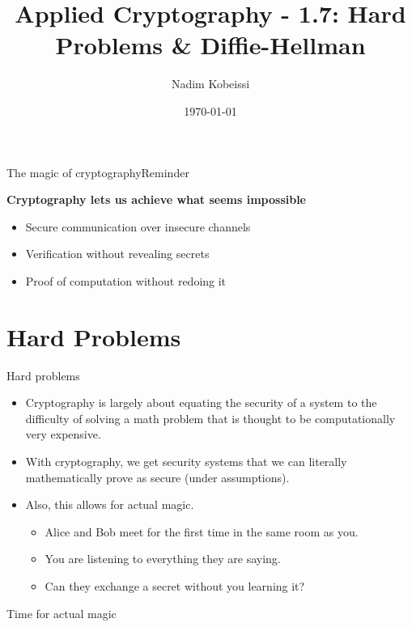 \ifdefined\PRESENTATION\else\PassOptionsToClass{handout}{beamer}\fi\documentclass[aspectratio=169, lualatex]{beamer}
\title{Applied Cryptography - 1.7: Hard Problems \& Diffie-Hellman}
\author{Nadim Kobeissi}
\institute{Symbolic Software}
\date{\today}
\begin{document}
\begin{frame}[plain]
	\titlepage
\end{frame}

\begin{frame}[c]{The magic of cryptography}{Reminder}
	\begin{center}
		\Large\textbf{Cryptography lets us achieve what seems impossible}
		\vspace{1cm}
		\begin{itemize}[<+->]
			\item Secure communication over insecure channels
			\item Verification without revealing secrets
			\item Proof of computation without redoing it
		\end{itemize}
	\end{center}
\end{frame}

\section{Hard Problems}

\begin{frame}{Hard problems}
	\begin{itemize}[<+->]
		\item Cryptography is largely about equating the security of a system to the
		      difficulty of solving a math problem that is thought to be computationally
		      very expensive.
		\item With cryptography, we get security systems that we can literally
		      mathematically prove as secure (under assumptions).
		\item Also, this allows for actual magic.
		      \begin{itemize}[<+->]
			      \item Alice and Bob meet for the first time in the same room as you.
			      \item You are listening to everything they are saying.
			      \item Can they exchange a secret without you learning it?
		      \end{itemize}
	\end{itemize}
\end{frame}

\begin{frame}{Time for actual magic}
\end{frame}
\end{document}
